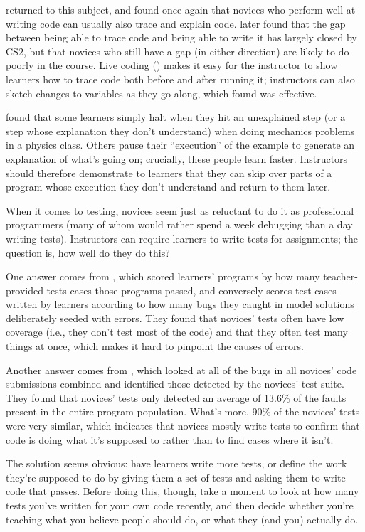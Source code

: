 \cite{List2009} returned to this subject, and found once again that
novices who perform well at writing code can usually also trace and
explain code.  \cite{Harr2018} later found that the gap between being
able to trace code and being able to write it has largely closed by
CS2, but that novices who still have a gap (in either direction) are
likely to do poorly in the course.  Live coding
() makes it easy for the instructor to show
learners how to trace code both before and after running it;
instructors can also sketch changes to variables as they go along,
which \cite{Cunn2017} found was effective.

\cite{Chi1989} found that some learners simply halt when they hit an
unexplained step (or a step whose explanation they don't understand)
when doing mechanics problems in a physics class.  Others pause their
``execution'' of the example to generate an explanation of what's
going on; crucially, these people learn faster.  Instructors should
therefore demonstrate to learners that they can skip over parts of a
program whose execution they don't understand and return to them
later.

When it comes to testing, novices seem just as reluctant to do it as
professional programmers (many of whom would rather spend a week
debugging than a day writing tests).  Instructors can require learners
to write tests for assignments; the question is, how well do they do
this?

One answer comes from \cite{Bria2015}, which scored learners' programs
by how many teacher-provided tests cases those programs passed, and
conversely scores test cases written by learners according to how many
bugs they caught in model solutions deliberately seeded with errors.
They found that novices' tests often have low coverage (i.e., they
don't test most of the code) and that they often test many things at
once, which makes it hard to pinpoint the causes of errors.

Another answer comes from \cite{Edwa2014b}, which looked at all of the
bugs in all novices' code submissions combined and identified those
detected by the novices' test suite.  They found that novices' tests
only detected an average of 13.6\% of the faults present in the entire
program population.  What's more, 90\% of the novices' tests were very
similar, which indicates that novices mostly write tests to confirm
that code is doing what it's supposed to rather than to find cases
where it isn't.

The solution seems obvious: have learners write more tests, or define
the work they're supposed to do by giving them a set of tests and
asking them to write code that passes.  Before doing this, though,
take a moment to look at how many tests you've written for your own
code recently, and then decide whether you're teaching what you
believe people should do, or what they (and you) actually do.

